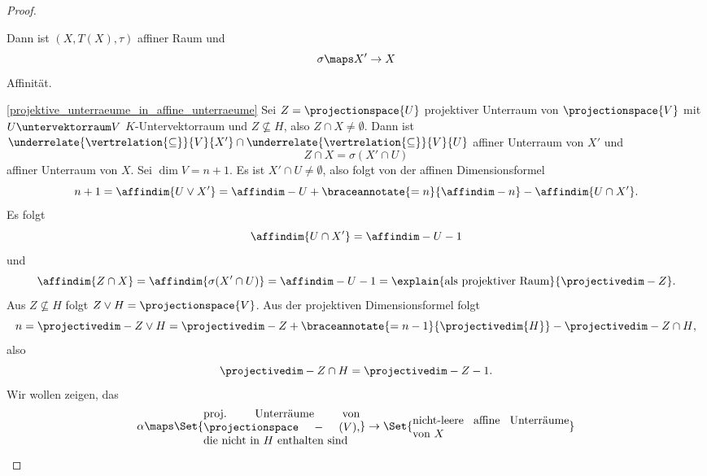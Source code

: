 \begin{proof}
\begin{proofdescription}
    Dann ist \( (X,T(X),\tau) \) affiner Raum und
    \begin{equation*}
      \sigma\maps X'\to X 
    \end{equation*}
    Affinität.
    \item[\ref{projektive_unterraeume_in_affine_unterraeume}] Sei \( Z=\projectionspace{U} \) projektiver Unterraum von \( \projectionspace{V} \) mit \( U\untervektorraum V \) \( K \)-Untervektorraum und \( Z\not\subseteq H \), also \( Z\cap X\neq \emptyset \). Dann ist \( \underrelate{\vertrelation{\subseteq}}{V}{X'}\cap  \underrelate{\vertrelation{\subseteq}}{V}{U} \) affiner Unterraum von \( X' \) und
    \begin{equation*}
      Z\cap X=\sigma(X'\cap U)
    \end{equation*}
    affiner Unterraum von \( X \).
     Sei \( \dim{V}=n+1 \). Es ist \( X'\cap U\neq \emptyset \), also folgt von der affinen Dimensionsformel
    \begin{equation*}
      n+1=\affindim{U\vee X'}=\affindim-{U}+\braceannotate{=n}{\affindim-{n}}-\affindim{U\cap X'}.
    \end{equation*}
    Es folgt
    \begin{equation*}
      \affindim{U\cap X'}=\affindim-{U}-1
    \end{equation*}
    und
    \begin{equation*}
      \affindim{Z\cap X}=\affindim{\sigma(X'\cap U)}=\affindim-{U}-1=\explain{\text{als projektiver Raum}}{\projectivedim-{Z}}.
    \end{equation*}
    Aus  \( Z\not\subseteq H \) folgt \( Z\vee H=\projectionspace{V} \). Aus der projektiven Dimensionsformel folgt
    \begin{equation*}
      n=\projectivedim-{Z\vee H}=\projectivedim-{Z}+\braceannotate{=n-1}{\projectivedim{H}}-\projectivedim-{Z\cap H},
    \end{equation*}
    also
    \begin{equation*}
      \projectivedim-{Z\cap H}=\projectivedim-{Z}-1.
    \end{equation*}
    Wir wollen zeigen, das 
    \begin{equation*}
      \begin{split}
      \alpha\maps \Set{\parbox{0.4\textwidth}{proj.\ Unterräume von \( \projectionspace-{(V)} \), die nicht in \( H \) enthalten sind}}&\to \Set{\parbox{0.4\textwidth}{nicht-leere affine Unterräume von \( X \)}}\\

\end{split}
\end{equation*}
\end{proofdescription}
\end{proof}

